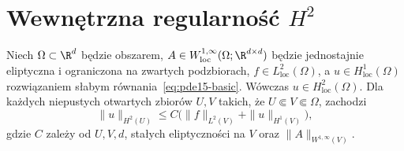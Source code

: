 \section[Wewnętrzna regularność Sobolewa drugiego rzędu]{Wewnętrzna regularność $H^2$}
\label{sec:pde15-h2}
\begin{twierdzenie}
\label{thm:pde15-h2}
Niech $\Omega\subset\R^d$ będzie obszarem,
$A\in W^{1,\infty}_{\mathrm{loc}}(\Omega;\R^{d\times d})$ będzie
jednostajnie eliptyczna i ograniczona na zwartych podzbiorach,
$f\in L^2_{\mathrm{loc}}(\Omega)$, a $u\in H^1_{\mathrm{loc}}(\Omega)$
rozwiązaniem słabym równania~\eqref{eq:pde15-basic}.
Wówczas $u\in H^2_{\mathrm{loc}}(\Omega)$. Dla każdych
niepustych otwartych zbiorów $U,V$ takich, że
$U\Subset V\Subset\Omega$, zachodzi
\begin{equation}\label{eq:pde15-h2-est}
 \|u\|_{H^2(U)}\le C\bigl(\|f\|_{L^2(V)}
 +\|u\|_{H^1(V)}\bigr),
\end{equation}
gdzie $C$ zależy od $U,V,d$, stałych eliptyczności na $V$
oraz $\|A\|_{W^{1,\infty}(V)}$.
\end{twierdzenie}
